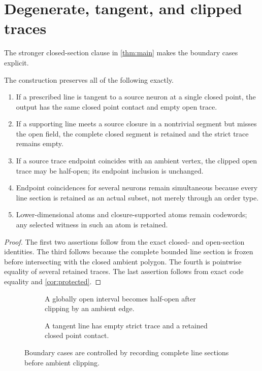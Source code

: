 \section{Degenerate, tangent, and clipped traces}\label{sec:degenerate}

The stronger closed-section clause in \cref{thm:main} makes the boundary
cases explicit.

\begin{corollary}
The construction preserves all of the following exactly.
\begin{enumerate}
\item If a prescribed line is tangent to a source neuron at a single closed
      point, the output has the same closed point contact and empty open
      trace.
\item If a supporting line meets a source closure in a nontrivial segment
      but misses the open field, the complete closed segment is retained and
      the strict trace remains empty.
\item If a source trace endpoint coincides with an ambient vertex, the
      clipped open trace may be half-open; its endpoint inclusion is
      unchanged.
\item Endpoint coincidences for several neurons remain simultaneous because
      every line section is retained as an actual subset, not merely through
      an order type.
\item Lower-dimensional atoms and closure-supported atoms remain codewords;
      any selected witness in such an atom is retained.
\end{enumerate}
\end{corollary}

\begin{proof}
The first two assertions follow from the exact closed- and open-section
identities.  The third follows because the complete bounded line section is
frozen before intersecting with the closed ambient polygon.  The fourth is
pointwise equality of several retained traces.  The last assertion follows
from exact code equality and \cref{cor:protected}.
\end{proof}

\begin{figure}[t]
\centering
\begin{subfigure}[t]{.46\textwidth}
\centering

\caption{A globally open interval becomes half-open after clipping by an
ambient edge.}\label{fig:halfopen}
\end{subfigure}\hfill
\begin{subfigure}[t]{.46\textwidth}
\centering

\caption{A tangent line has empty strict trace and a retained closed point
contact.}\label{fig:tangent}
\end{subfigure}
\caption{Boundary cases are controlled by recording complete line sections
before ambient clipping.}
\end{figure}

